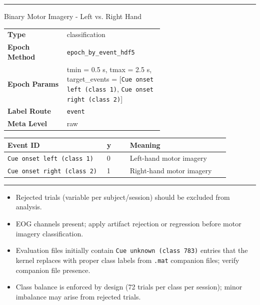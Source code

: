 {\begin{tcolorbox}
\begin{itemize}[leftmargin=1.3em,noitemsep,topsep=1pt]
\end{itemize}
\noindent\rule{\linewidth}{0.4pt}\par\nopagebreak
{} {\footnotesize Binary Motor Imagery - Left vs. Right Hand}\par\smallskip
{\footnotesize\begin{tabular}{@{}lp{0.62\linewidth}@{}}
\textbf{Type} & classification \\
\textbf{Epoch Method} & \texttt{epoch\_by\_event\_hdf5} \\
\textbf{Epoch Params} & tmin = 0.5 s, tmax = 2.5 s, target\_events = [\texttt{Cue onset left (class 1)}, \texttt{Cue onset right (class 2)}] \\
\textbf{Label Route} & \texttt{event} \\
\textbf{Meta Level} & raw \\
\end{tabular}}
\par{}\par\smallskip
\begingroup\footnotesize
\begin{tabular}{@{}p{0.3911\linewidth}p{0.0978\linewidth}p{0.3911\linewidth}@{}}
\toprule
\textbf{Event ID} & \textbf{y} & \textbf{Meaning} \\
\midrule
\texttt{Cue onset left (class 1)} & 0 & Left-hand motor imagery \\
\texttt{Cue onset right (class 2)} & 1 & Right-hand motor imagery \\
\bottomrule
\end{tabular}
\endgroup
\par\smallskip
\noindent\rule{\linewidth}{0.4pt}\par\nopagebreak
{}\par\smallskip
\begin{itemize}[leftmargin=1.4em,noitemsep,topsep=2pt]
\item{\footnotesize Rejected trials (variable per subject/session) should be excluded from analysis.}
\item{\footnotesize EOG channels present; apply artifact rejection or regression before motor imagery classification.}
\item{\footnotesize Evaluation files initially contain \texttt{Cue unknown (class 783)} entries that the kernel replaces with proper class labels from \texttt{.mat} companion files; verify companion file presence.}
\item{\footnotesize Class balance is enforced by design (72 trials per class per session); minor imbalance may arise from rejected trials.}

\end{itemize}
\end{tcolorbox}}
